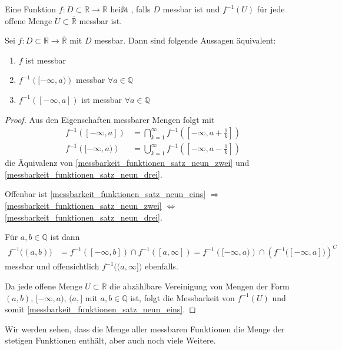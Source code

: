 \begin{*definition}[messbar]
	Eine Funktion $f:D\subset\mathbb{R}\to\overline{\mathbb{R}}$ heißt , falls $D$ messbar ist und $f^{-1}(U)$ für jede offene Menge $U\subset\overline{\mathbb{R}}$ messbar ist.
\end{*definition}

\begin{conclusion}
	Sei $f:D\subset\mathbb{R}\to\overline{\mathbb{R}}$ mit $D$ messbar. Dann sind folgende Aussagen äquivalent:\begin{enumerate}[label={(\alph*)}]
		\item {}
		$f$ ist messbar
		\item {}
		$f^{-1}\left( [-\infty, a)\right)$ messbar $\forall a\in\mathbb{Q}$
		\item {}
		$f^{-1}\left( [-\infty, a] \right)$ ist messbar $\forall a\in \mathbb{Q}$
	\end{enumerate}
\end{conclusion}

\begin{proof}
	Aus den Eigenschaften messbarer Mengen folgt mit \begin{align*}
		f^{-1}\left( [-\infty, a]\right) &= \bigcap_{k=1}^\infty f^{-1}\left( \left[ -\infty, a + \frac{1}{k} \right]\right) \\
		f^{-1} \left([-\infty, a)\right) &= \bigcup_{k=1}^\infty f^{-1}\left( \left[ -\infty, a - \frac{1}{k}\right] \right)
	\end{align*}
	die Äquivalenz von \ref{messbarkeit_funktionen_satz_neun_zwei} und \ref{messbarkeit_funktionen_satz_neun_drei}.
	
	Offenbar ist \ref{messbarkeit_funktionen_satz_neun_eins} $\Rightarrow$ \ref{messbarkeit_funktionen_satz_neun_zwei} $\Leftrightarrow$ \ref{messbarkeit_funktionen_satz_neun_drei}.
	
	Für $a,b\in\mathbb{Q}$ ist dann \begin{align*}
		f^{-1}\big( (a,b) \big) &= f^{-1}\left( [-\infty, b]\right) \cap f^{-1}\left( [a,\infty] \right) = f^{-1}\left( [-\infty, a)\right) \cap \left( f^{-1} \big( [-\infty, a] \big)\right)^C
	\end{align*}
	messbar und offensichtlich $f^{-1}\big( (a,\infty] \big)$ ebenfalls.
	
	Da jede offene Menge $U\subset\overline{\mathbb{R}}$ die abzählbare Vereinigung von Mengen der Form $(a,b)$, $[-\infty, a)$, $(a,]$ mit $a,b\in\mathbb{Q}$ ist, folgt die Messbarkeit von $f^{-1}(U)$ und somit \ref{messbarkeit_funktionen_satz_neun_eins}.
\end{proof}
\begin{underlinedenvironment}[Hinweis]
	Wir werden sehen, dass die Menge aller messbaren Funktionen die Menge der stetigen Funktionen enthält, aber auch noch viele Weitere.
\end{underlinedenvironment}

